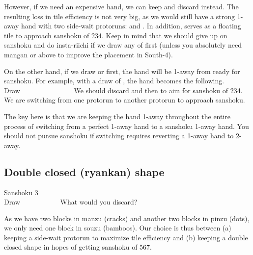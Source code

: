 \bigskip
However, if we need an expensive hand, we can keep {\LARGE{}} and discard {\LARGE{}} instead. The resulting loss in tile efficiency is not very big, as we would still have a strong 1-away hand with two side-wait protoruns: {\LARGE{}} and {\LARGE{}}. In addition, {\LARGE{}} serves as a floating tile to approach {\jap sanshoku} of 234.
Keep in mind that we should give up on {\jap sanshoku} and do insta-riichi if we draw any of {\LARGE{}} first (unless you absolutely need {\jap mangan} or above to improve the placement in South-4).

\bigskip
On the other hand, if we draw {\LARGE{}} or {\LARGE{}} first, the hand will be 1-away from ready for {\jap sanshoku}. For example, with a draw of {\LARGE{}}, the hand becomes the following.
\bp
{}~\\
\hfill\footnotesize{Draw~~~~~~~~~~~~~~~}
\ep
We should discard {\LARGE{}} and then {\LARGE{}} to aim for {\jap sanshoku} of 234. We are switching from one protorun {\LARGE{}} to another protorun {\LARGE{}} to approach {\jap sanshoku}.

\bigskip
The key here is that we are keeping the hand 1-away throughout the entire process of switching from a perfect 1-away hand to a {\jap sanshoku} 1-away hand. You should not pursue {\jap sanshoku} if switching requires reverting a 1-away hand to 2-away.


\bigskip
\subsection{Double closed ({\jap ryankan}) shape}\label{sec:san3}

\begin{itembox}[r]{{\jap Sanshoku} 3}
\bp
{}~\\
\hfill\footnotesize{Draw~~~~~~~~~~~}
\ep
\vspace{-17pt}What would you discard? \vspace{-5pt}
\end{itembox}
\noindent
As we have two blocks in {\jap manzu} (cracks) and another two blocks in {\jap pinzu} (dots), we only need one block in {\jap souzu} (bamboos). Our choice is thus between (a) keeping a side-wait protorun {\LARGE{}} to maximize tile efficiency and (b) keeping a double closed shape {\LARGE{}} in hopes of getting {\jap sanshoku} of 567.

